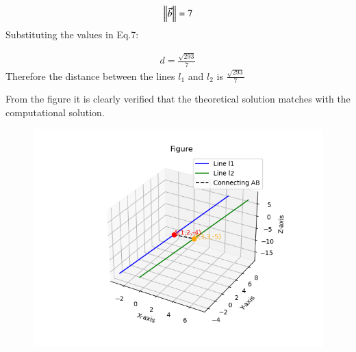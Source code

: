 \documentclass[journal]{IEEEtran}
\theoremstyle{remark}
\begin{document}
\begin{align}
    \left\lVert\Vec{b}\right\rVert=7
\end{align}
Substituting the values in Eq.7:

\begin{align}
  d=\frac{\sqrt{293}}{7}
\end{align}
Therefore the distance between the lines $l_1$ and $l_2$ is $\frac{\sqrt{293}}{7}$

From the figure it is clearly verified that the theoretical solution matches with the computational solution.\\
\begin{figure}[h]
    \centering
    \includegraphics[height=0.5\textheight, keepaspectratio]{figs/figure1.png}
    \label{figure_1}
\end{figure}
\end{document}
